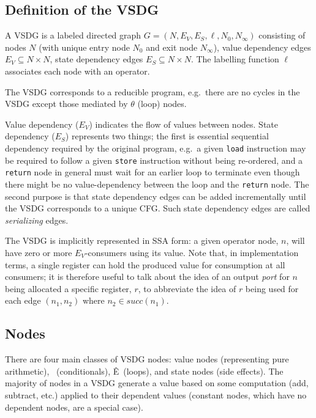 
\subsection{Definition of the VSDG}

A VSDG is a labeled directed graph $G=(N,E_V,E_S,\ell,N_0,N_\infty)$ consisting of nodes $N$ (with unique entry node $N_0$ and exit node $N_\infty$), value dependency edges $E_V \subseteq N \times N$, state dependency edges $E_S \subseteq N \times N$. 
The labelling function $\ell$ associates each node with an operator.

The VSDG corresponds to a reducible program, e.g.~there are no cycles in the VSDG except those mediated by $\theta$ (loop) nodes.

Value dependency ($E_V$) indicates the flow of values between nodes. 
State dependency ($E_S$) represents two things; 
the first is essential sequential dependency required by the original program, e.g.~a given \texttt{load} instruction may be required to follow a given \texttt{store} instruction without being re-ordered, and a \texttt{return} node in general must wait for an earlier loop to terminate even though there might be no value-dependency between the loop and the \texttt{return} node. 
The second purpose is that state dependency edges can be added incrementally until the VSDG corresponds to a unique CFG. 
Such state dependency edges are called {\em serializing} edges.

The VSDG is implicitly represented in SSA form: 
a given operator node, $n$, will have zero or more $E_V$-consumers using its value. 
Note that, in implementation terms, a single register can hold the produced value for consumption at all consumers; 
it is therefore useful to talk about the idea of an output {\em port} for $n$ being allocated a specific register, $r$, to abbreviate the idea of $r$ being used for each edge $(n_1,n_2)$ where $n_2 \in \textit{succ}(n_1)$.


\subsection{Nodes}
There are four main classes of VSDG nodes: 
value nodes (representing pure arithmetic), \Gns\ (conditionals), Ê\Tns\ (loops), and state nodes (side effects). 
The majority of nodes in a VSDG generate a value based on some computation (add, subtract, etc.) applied to their dependent values (constant nodes, which have no dependent nodes, are a special case).


